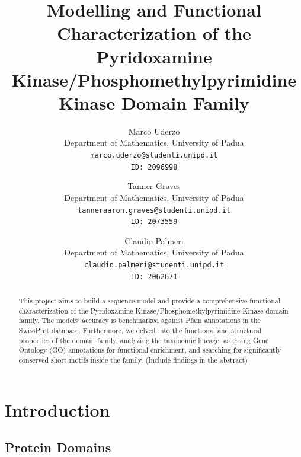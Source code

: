 \documentclass[10pt,twocolumn,letterpaper]{article}
\begin{document}

\title{Modelling and Functional Characterization of the Pyridoxamine Kinase/Phosphomethylpyrimidine Kinase Domain Family}

\author{
Marco Uderzo\\
{\small Department of Mathematics, University of Padua}\\
{\tt\small marco.uderzo@studenti.unipd.it}\\
{\tt\small ID: 2096998} \\
\and
Tanner Graves\\
{\small Department of Mathematics, University of Padua}\\
{\tt\small tanneraaron.graves@studenti.unipd.it}\\
{\tt\small ID: 2073559} \\
\and
Claudio Palmeri \\
{\small Department of Mathematics, University of Padua}\\
{\tt\small claudio.palmeri@studenti.unipd.it}\\
{\tt\small ID: 2062671} \\
}


\maketitle


\begin{abstract}
    This project aims to build a sequence model and provide a comprehensive functional characterization of the Pyridoxamine Kinase/Phosphomethylpyrimidine Kinase domain family. The models' accuracy is benchmarked against Pfam annotations in the SwissProt database. Furthermore, we delved into the functional and structural properties of the domain family, analyzing the taxonomic lineage, assessing Gene Ontology (GO) annotations for functional enrichment, and searching for significantly conserved short motifs inside the family. (Include findings in the abstract)
\end{abstract}

\section{Introduction}

\subsection{Protein Domains}
\end{document}

